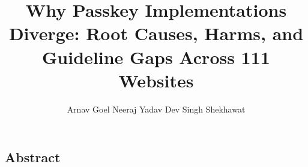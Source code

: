 \documentclass[letterpaper,twocolumn,10pt]{article}
\date{}
\title{\Large\bfseries Why Passkey Implementations Diverge: Root Causes, Harms, and\\Guideline Gaps Across 111 Websites}
\author{Arnav Goel \qquad Neeraj Yadav \qquad Dev Singh Shekhawat\\\relax {\normalsize Department of Computer Science and Engineering, Shiv Nadar University}}
\begin{document}
\maketitle
\thispagestyle{empty}
\subsection*{Abstract}

\end{document}

